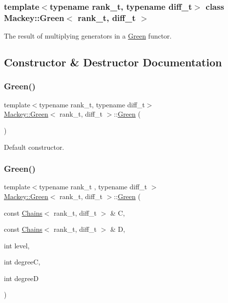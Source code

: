 \subsubsection*{template$<$typename rank\+\_\+t, typename diff\+\_\+t$>$\newline
class Mackey\+::\+Green$<$ rank\+\_\+t, diff\+\_\+t $>$}

The result of multiplying generators in a \hyperlink{classMackey_1_1Green}{Green} functor. 

\subsection{Constructor \& Destructor Documentation}
\mbox{\label{classMackey_1_1Green_ad3bb0ba97c91a5db4fcf57687a571915}} 
\subsubsection{\texorpdfstring{Green()}{Green()}\hspace{0.1cm}{\footnotesize\ttfamily [1/2]}}
{\footnotesize\ttfamily template$<$typename rank\+\_\+t, typename diff\+\_\+t$>$ \\
\hyperlink{classMackey_1_1Green}{Mackey\+::\+Green}$<$ rank\+\_\+t, diff\+\_\+t $>$\+::\hyperlink{classMackey_1_1Green}{Green} (\begin{DoxyParamCaption}{ }\end{DoxyParamCaption})\hspace{0.3cm}{\ttfamily [inline]}}



Default constructor. 

\mbox{\label{classMackey_1_1Green_a614ae228cc8c5cccddcf562923f06f3a}} 
\subsubsection{\texorpdfstring{Green()}{Green()}\hspace{0.1cm}{\footnotesize\ttfamily [2/2]}}
{\footnotesize\ttfamily template$<$typename rank\+\_\+t , typename diff\+\_\+t $>$ \\
\hyperlink{classMackey_1_1Green}{Mackey\+::\+Green}$<$ rank\+\_\+t, diff\+\_\+t $>$\+::\hyperlink{classMackey_1_1Green}{Green} (\begin{DoxyParamCaption}\item[{const \hyperlink{classMackey_1_1Chains}{Chains}$<$ rank\+\_\+t, diff\+\_\+t $>$ \&}]{C,  }\item[{const \hyperlink{classMackey_1_1Chains}{Chains}$<$ rank\+\_\+t, diff\+\_\+t $>$ \&}]{D,  }\item[{int}]{level,  }\item[{int}]{degreeC,  }\item[{int}]{degreeD }\end{DoxyParamCaption})}



